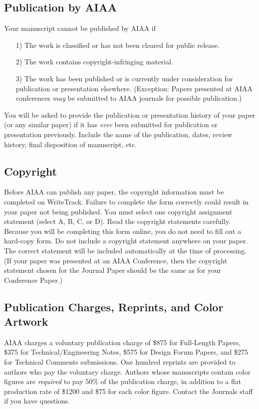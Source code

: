 \documentclass{AIAA}
\begin{document}
\subsection{Publication by AIAA}
Your manuscript cannot be published by AIAA if
\begin{enumerate}
\item[1)]The work is classified or has not been cleared for public release.

\item[2)]The work contains copyright-infringing material.

\item[3)]The work has been published or is currently under consideration for publication or presentation elsewhere. (Exception: Papers presented at AIAA conferences \textit{may} be submitted to AIAA journals for possible publication.)
\end{enumerate}

You will be asked to provide the publication or presentation history of your paper (or any similar paper) if it has \textit{ever} been submitted for publication or presentation previously. Include the name of the publication, dates, review history, final disposition of manuscript, etc.

\subsection{Copyright}
Before AIAA can publish any paper, the copyright information must be completed on WriteTrack. Failure to complete the form correctly could result in your paper not being published. You must select one copyright assignment statement (select A, B, C, or D). Read the copyright statements carefully. Because you will be completing this form online, you do not need to fill out a hard-copy form. Do not include a copyright statement anywhere on your paper. The correct statement will be included automatically at the time of processing. (If your paper was presented at an AIAA Conference, then the copyright statement chosen for the Journal Paper should be the same as for your Conference Paper.)

\subsection{Publication Charges, Reprints, and Color Artwork}
AIAA charges a voluntary publication charge of \$875 for Full-Length Papers, \$375 for Technical/Engineering Notes, \$575 for Design Forum Papers, and \$275 for Technical Comments submissions. One hundred reprints are provided to authors who pay the voluntary charge. Authors whose manuscripts contain color figures are \textit{required} to pay 50\% of the publication charge, in addition to a flat production rate of \$1200 and \$75 for each color figure. Contact the Journals staff if you have questions.
\end{document}
